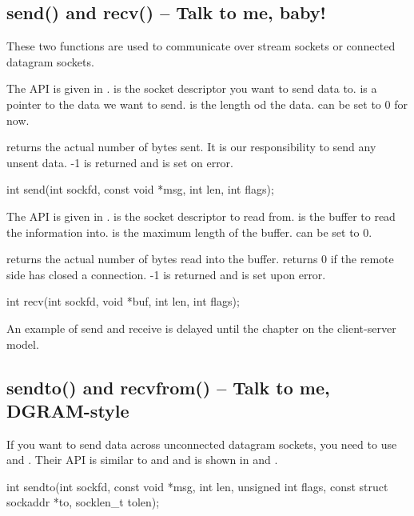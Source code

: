 
\subsection{send() and recv() -- Talk to me, baby!}
These two functions are used to communicate over stream sockets or connected datagram sockets.

The  API is given in .  is the socket descriptor you want to send data to.  is a pointer to the data we want to send.  is the length od the data.  can be set to 0 for now.

 returns the actual number of bytes sent. It is our responsibility to send any unsent data. -1 is returned and  is set on error.

\begin{CPP}[label=list:send-api,caption=send API]
int send(int sockfd, const void *msg, int len, int flags);
\end{CPP}

The  API is given in .  is the socket descriptor to read from.  is the buffer to read the information into.  is the maximum length of the buffer.  can be set to 0.

 returns the actual number of bytes read into the buffer.  returns 0 if the remote side has closed a connection. -1 is returned and  is set upon error.

\begin{CPP}[label=list:recv-api,caption=recv API]
int recv(int sockfd, void *buf, int len, int flags);
\end{CPP}

An example of send and receive is delayed until the chapter on the client-server model.

\subsection{sendto() and recvfrom() -- Talk to me, DGRAM-style}
If you want to send data across unconnected datagram sockets, you need to use  and . Their API is similar to  and  and is shown in  and .

\begin{CPP}[label=list:sendto-api,caption=sendto API]
int sendto(int sockfd, const void *msg, int len, unsigned int flags,
        const struct sockaddr *to, socklen_t tolen);
\end{CPP}


